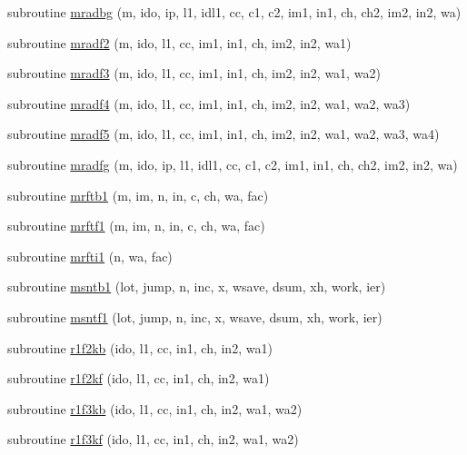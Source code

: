 \begin{DoxyCompactItemize}
\item 
subroutine \mbox{\hyperlink{namespacefftclass_ae156d4969bbcc9250a0dc81ee91d3cdf}{mradbg}} (m, ido, ip, l1, idl1, cc, c1, c2, im1, in1, ch, ch2, im2, in2, wa)
\item 
subroutine \mbox{\hyperlink{namespacefftclass_a577b893eadc27ccc53b888490cb1b873}{mradf2}} (m, ido, l1, cc, im1, in1, ch, im2, in2, wa1)
\item 
subroutine \mbox{\hyperlink{namespacefftclass_a4e99b7194e96b9a086f743a98205cc5a}{mradf3}} (m, ido, l1, cc, im1, in1, ch, im2, in2, wa1, wa2)
\item 
subroutine \mbox{\hyperlink{namespacefftclass_aec86b95620b11b4db180468a4f771842}{mradf4}} (m, ido, l1, cc, im1, in1, ch, im2, in2, wa1, wa2, wa3)
\item 
subroutine \mbox{\hyperlink{namespacefftclass_ab6d74e30932fcf82744ac339de050933}{mradf5}} (m, ido, l1, cc, im1, in1, ch, im2, in2, wa1, wa2, wa3, wa4)
\item 
subroutine \mbox{\hyperlink{namespacefftclass_a5741ec7db9519828a0c46df4355b734d}{mradfg}} (m, ido, ip, l1, idl1, cc, c1, c2, im1, in1, ch, ch2, im2, in2, wa)
\item 
subroutine \mbox{\hyperlink{namespacefftclass_a025f68a6ddd573ad3fa337835b621d3c}{mrftb1}} (m, im, n, in, c, ch, wa, fac)
\item 
subroutine \mbox{\hyperlink{namespacefftclass_a5b17cd46c9d021ed6dfe9499fc802b3f}{mrftf1}} (m, im, n, in, c, ch, wa, fac)
\item 
subroutine \mbox{\hyperlink{namespacefftclass_a88a3f7fd420d15d4e4d603d4d8ebf38e}{mrfti1}} (n, wa, fac)
\item 
subroutine \mbox{\hyperlink{namespacefftclass_aebd25014fd97baa3be31bda9b446e99f}{msntb1}} (lot, jump, n, inc, x, wsave, dsum, xh, work, ier)
\item 
subroutine \mbox{\hyperlink{namespacefftclass_a151bd1685dbe69c9c36a08ff00a7e10e}{msntf1}} (lot, jump, n, inc, x, wsave, dsum, xh, work, ier)
\item 
subroutine \mbox{\hyperlink{namespacefftclass_a6cf75b3c3c340adb4eb40e50289cf439}{r1f2kb}} (ido, l1, cc, in1, ch, in2, wa1)
\item 
subroutine \mbox{\hyperlink{namespacefftclass_a9d3bdd521a616fe934704cb38ac074f4}{r1f2kf}} (ido, l1, cc, in1, ch, in2, wa1)
\item 
subroutine \mbox{\hyperlink{namespacefftclass_ad450dc5bf08d49d4784e609c41b42950}{r1f3kb}} (ido, l1, cc, in1, ch, in2, wa1, wa2)
\item 
subroutine \mbox{\hyperlink{namespacefftclass_a382f39146e7d8e1450810efdc6f4cd79}{r1f3kf}} (ido, l1, cc, in1, ch, in2, wa1, wa2)

\end{DoxyCompactItemize}
